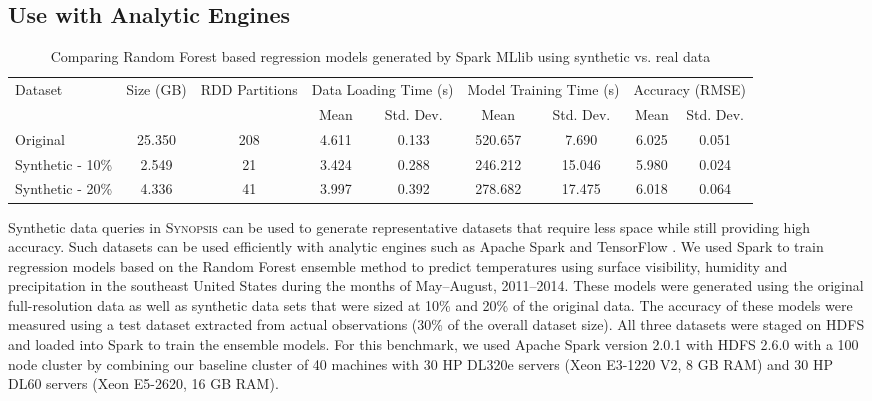 \subsection{Use with Analytic Engines}
%
\begin{table*}[h!]
    \renewcommand{\arraystretch}{1.3}
    \caption{Comparing Random Forest based regression models generated by Spark MLlib using synthetic vs. real data \vspace{-1em}}
    \label{tab:spark-rf}
    \begin{center}
        \begin{tabularx}{\textwidth}{|X|c|c|c|c|c|c|c|c|}
            \hline
            \multirow{2}{*}{Dataset} & \multirow{2}{*}{Size (GB)} & \multirow{2}{*}{RDD Partitions} & \multicolumn{2}{c|}{\cellcolor[gray]{0.7}Data Loading Time (s)} &\multicolumn{2}{c|}{\cellcolor[gray]{0.7}Model Training Time (s)} & \multicolumn{2}{c|}{\cellcolor[gray]{0.7}Accuracy (RMSE)}\\
            \cline{4-9}
             & & & \cellcolor[gray]{0.9}Mean & \cellcolor[gray]{0.9}Std. Dev.  &  \cellcolor[gray]{0.9}Mean & \cellcolor[gray]{0.9}Std. Dev. &  \cellcolor[gray]{0.9}Mean & \cellcolor[gray]{0.9}Std. Dev. \\
            \hline
            Original & 25.350 & 208 & 4.611 & 0.133 & 520.657 & 7.690 & 6.025 & 0.051 \\
            \hline
            Synthetic - 10\% & 2.549 & 21 & 3.424 & 0.288 & 246.212 & 15.046 & 5.980 & 0.024 \\
            \hline
            Synthetic - 20\% & 4.336 & 41 & 3.997 & 0.392 & 278.682 & 17.475 & 6.018 & 0.064 \\
            \hline
        \end{tabularx}
    \end{center}
    \vspace{-1em}
\end{table*}
%
Synthetic data queries in \textsc{Synopsis} can be used to generate representative datasets that require less space while still providing high accuracy.  
Such datasets can be used efficiently with analytic engines such as Apache Spark \cite{zaharia2010spark} and TensorFlow \cite{tensorflow}.  
We used Spark to train regression models based on the Random Forest ensemble method to predict temperatures using surface visibility, humidity and precipitation in the southeast United States during the months of May--August, 2011--2014.
These models were generated using the original full-resolution data as well as synthetic data sets that were sized at 10\% and 20\% of the original data.
The accuracy of these models were measured using a test dataset extracted from actual observations (30\% of the overall dataset size).
All three datasets were staged on HDFS and loaded into Spark to train the ensemble models.
For this benchmark, we used Apache Spark version 2.0.1 with HDFS 2.6.0 with a 100 node cluster by combining our baseline cluster of 40 machines with 30 HP DL320e servers (Xeon E3-1220 V2, 8 GB RAM) and 30 HP DL60 servers (Xeon E5-2620, 16 GB RAM). 

